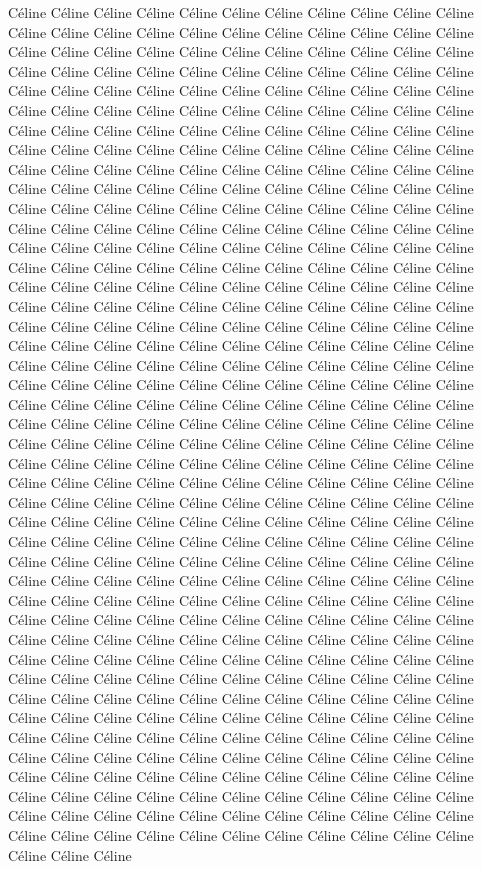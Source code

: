 \documentclass[10pt,a4paper]{article}
\begin{document}
Céline Céline Céline Céline Céline Céline Céline Céline Céline Céline Céline Céline Céline Céline Céline Céline Céline Céline Céline Céline Céline Céline Céline Céline Céline Céline Céline Céline Céline Céline Céline Céline Céline Céline Céline Céline Céline Céline Céline Céline Céline Céline Céline Céline Céline Céline Céline Céline Céline Céline Céline Céline Céline Céline Céline Céline Céline Céline Céline Céline Céline Céline Céline Céline Céline Céline Céline Céline Céline Céline Céline Céline Céline Céline Céline Céline Céline Céline Céline Céline Céline Céline Céline Céline Céline Céline Céline Céline Céline Céline Céline Céline Céline Céline Céline Céline Céline Céline Céline Céline Céline Céline Céline Céline Céline Céline Céline Céline Céline Céline Céline Céline Céline Céline Céline Céline Céline Céline Céline Céline Céline Céline Céline Céline Céline Céline Céline Céline Céline Céline Céline Céline Céline Céline Céline Céline Céline Céline Céline Céline Céline Céline Céline Céline Céline Céline Céline Céline Céline Céline Céline Céline Céline Céline Céline Céline Céline Céline Céline Céline Céline Céline Céline Céline Céline Céline Céline Céline Céline Céline Céline Céline Céline Céline Céline Céline Céline Céline Céline Céline Céline Céline Céline Céline Céline Céline Céline Céline Céline Céline Céline Céline Céline Céline Céline Céline Céline Céline Céline Céline Céline Céline Céline Céline Céline Céline Céline Céline Céline Céline Céline Céline Céline Céline Céline Céline Céline Céline Céline Céline Céline Céline Céline Céline Céline Céline Céline Céline Céline Céline Céline Céline Céline Céline Céline Céline Céline Céline Céline Céline Céline Céline Céline Céline Céline Céline Céline Céline Céline Céline Céline Céline Céline Céline Céline Céline Céline Céline Céline Céline Céline Céline Céline Céline Céline Céline Céline Céline Céline Céline Céline Céline Céline Céline Céline Céline Céline Céline Céline Céline Céline Céline Céline Céline Céline Céline Céline Céline Céline Céline Céline Céline Céline Céline Céline Céline Céline Céline Céline Céline Céline Céline Céline Céline Céline Céline Céline Céline Céline Céline Céline Céline Céline Céline Céline Céline Céline Céline Céline Céline Céline Céline Céline Céline Céline Céline Céline Céline Céline Céline Céline Céline Céline Céline Céline Céline Céline Céline Céline Céline Céline Céline Céline Céline Céline Céline Céline Céline Céline Céline Céline Céline Céline Céline Céline Céline Céline Céline Céline Céline Céline Céline Céline Céline Céline Céline Céline Céline Céline Céline Céline Céline Céline Céline Céline Céline Céline Céline Céline Céline Céline Céline Céline Céline Céline Céline Céline Céline Céline Céline Céline Céline Céline Céline Céline Céline Céline Céline Céline Céline Céline Céline Céline Céline Céline Céline Céline Céline Céline Céline Céline Céline Céline Céline Céline Céline Céline Céline Céline Céline Céline Céline Céline Céline Céline Céline Céline Céline Céline Céline Céline Céline Céline Céline Céline Céline Céline Céline Céline Céline Céline Céline Céline Céline Céline Céline Céline Céline Céline Céline Céline Céline Céline Céline Céline Céline Céline Céline Céline Céline Céline Céline Céline Céline Céline Céline Céline Céline Céline Céline Céline Céline Céline Céline Céline Céline 
\end{document}
